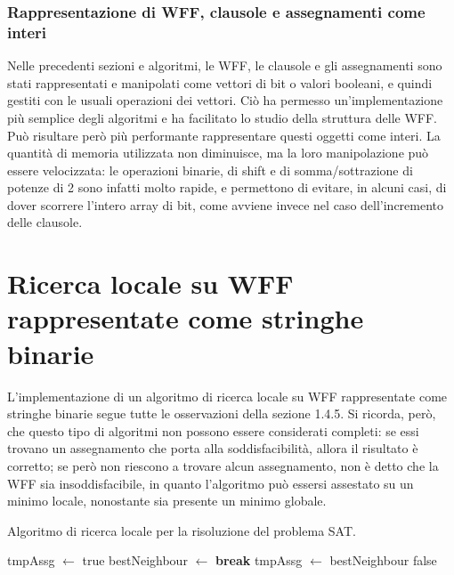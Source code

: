 \subsubsection{Rappresentazione di WFF, clausole e assegnamenti come interi}
Nelle precedenti sezioni e algoritmi, le WFF, le clausole e gli assegnamenti sono stati rappresentati e manipolati come vettori di bit o valori booleani, e quindi gestiti con le usuali operazioni dei vettori. Ciò ha permesso un'implementazione più semplice degli algoritmi e ha facilitato lo studio della struttura delle WFF.\\
Può risultare però più performante rappresentare questi oggetti come interi. 
La quantità di memoria utilizzata non diminuisce, ma la loro manipolazione può essere velocizzata: le operazioni binarie, di shift e di somma/sottrazione di potenze di 2 sono infatti molto rapide, e permettono di evitare, in alcuni casi, di dover scorrere l'intero array di bit, come avviene invece nel caso dell'incremento delle clausole.

\section{Ricerca locale su WFF rappresentate come stringhe binarie}
L'implementazione di un algoritmo di ricerca locale su WFF rappresentate come stringhe binarie segue
tutte le osservazioni della sezione 1.4.5.
Si ricorda, però, che questo tipo di algoritmi non possono essere considerati completi: se essi trovano un assegnamento che porta alla soddisfacibilità, allora il risultato è corretto; se però non riescono a trovare alcun assegnamento, non è detto che la WFF sia insoddisfacibile, in quanto l'algoritmo può essersi assestato su un minimo locale, nonostante sia presente un minimo globale.

\begin{algorithm}[H]
    \caption{Algoritmo di ricerca locale per la risoluzione del problema SAT.}
    \label{alg:local_search}
    \begin{algorithmic}[1]
            \State tmpAssg $\gets$ 
                        \State \Return true
                    \EndIf
                    \State bestNeighbour $\gets$ 
                        \State \textbf{break}
                    \EndIf
                    \State tmpAssg $\gets$ bestNeighbour
                \EndFor
            \EndFor
            \State \Return false
        \EndProcedure
    \end{algorithmic}
\end{algorithm}

